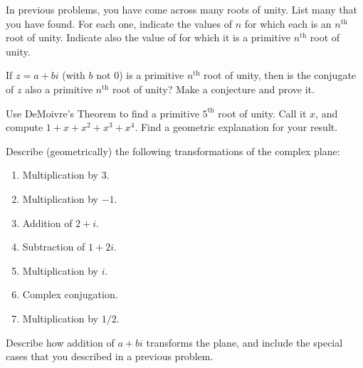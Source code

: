 \documentclass[space,nooutcomes]{ximera}
\begin{document}
\begin{problem}
In previous problems, you have come across many roots of unity.  List many that you have found.  For each one, indicate the values of $n$ for which each is an $n^\text{th}$ root of unity.  Indicate also the value of for which it is a primitive $n^\text{th}$ root of unity.  
\vfill
\end{problem}


\begin{problem}
If $z = a + bi$ (with $b$ not $0$) is a primitive $n^\text{th}$ root of unity, then is the conjugate of $z$ also a primitive $n^\text{th}$ root of unity?  Make a conjecture and prove it.
\vfill 
\end{problem}

\begin{problem}
Use DeMoivre's Theorem to find a primitive $5^\text{th}$ root of unity.  Call it $x$, and compute $1+x+x^2+x^3+x^4$. Find a geometric explanation for your result.  
\vfill 
\end{problem}


\newpage 


\begin{problem}
Describe (geometrically) the following transformations of the complex plane: 
\begin{enumerate}
\item Multiplication by $3$. 
\item Multiplication by $-1$. 
\item Addition of $2 + i$. 
\item Subtraction of $1 + 2i$.  
\item Multiplication by $i$. 
\item Complex conjugation. 
\item Multiplication by $1/2$.  
\end{enumerate}
\vfill 
\end{problem}

\begin{problem}
Describe how addition of $a + bi$ transforms the plane, and include the special cases that you described in a previous problem.
\vfill 
\end{problem}
\end{document}
